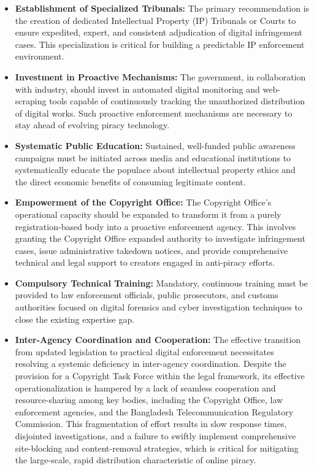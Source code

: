 \documentclass[10pt,letterpaper]{article}
\begin{document}
\begin{itemize}
   \item \textbf{Establishment of Specialized Tribunals:} The primary recommendation is the creation of dedicated Intellectual Property (IP) Tribunals or Courts to ensure expedited, expert, and consistent adjudication of digital infringement cases. This specialization is critical for building a predictable IP enforcement environment.
   
   \item \textbf{Investment in Proactive Mechanisms:} The government, in collaboration with industry, should invest in automated digital monitoring and web-scraping tools capable of continuously tracking the unauthorized distribution of digital works. Such proactive enforcement mechanisms are necessary to stay ahead of evolving piracy technology.
   
   \item \textbf{Systematic Public Education:} Sustained, well-funded public awareness campaigns must be initiated across media and educational institutions to systematically educate the populace about intellectual property ethics and the direct economic benefits of consuming legitimate content.
   
   \item \textbf{Empowerment of the Copyright Office:} The Copyright Office's operational capacity should be expanded to transform it from a purely registration-based body into a proactive enforcement agency. This involves granting the Copyright Office expanded authority to investigate infringement cases, issue administrative takedown notices, and provide comprehensive technical and legal support to creators engaged in anti-piracy efforts.
   
   \item \textbf{Compulsory Technical Training:} Mandatory, continuous training must be provided to law enforcement officials, public prosecutors, and customs authorities focused on digital forensics and cyber investigation techniques to close the existing expertise gap.
   
   \item \textbf{Inter-Agency Coordination and Cooperation:}
   The effective transition from updated legislation to practical digital enforcement necessitates resolving a systemic deficiency in inter-agency coordination. Despite the provision for a Copyright Task Force within the legal framework, its effective operationalization is hampered by a lack of seamless cooperation and resource-sharing among key bodies, including the Copyright Office, law enforcement agencies, and the Bangladesh Telecommunication Regulatory Commission. This fragmentation of effort results in slow response times, disjointed investigations, and a failure to swiftly implement comprehensive site-blocking and content-removal strategies, which is critical for mitigating the large-scale, rapid distribution characteristic of online piracy.
\end{itemize}
\end{document}
